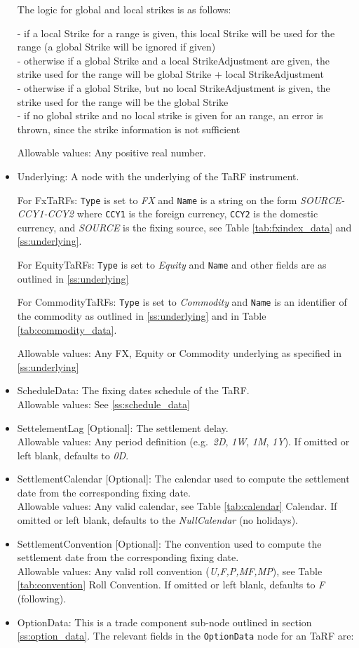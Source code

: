 \begin{itemize}
The logic for global and local strikes is as follows:

- if a local Strike for a range is given, this local Strike will be used for the range (a global Strike will be ignored if given)\\
- otherwise if a global Strike and a local StrikeAdjustment are given, the strike used for the range will be global Strike + local StrikeAdjustment\\
- otherwise if a global Strike, but no local StrikeAdjustment is given, the strike used for the range will be the global Strike\\
- if no global strike and no local strike is given for an range, an error is thrown, since the strike information is not sufficient
    
      Allowable values: Any positive real number. 
    \item Underlying: A node with the underlying of the TaRF instrument.

For FxTaRFs: \lstinline!Type! is set to \emph{FX} and \lstinline!Name! is a string on the form \emph{SOURCE-CCY1-CCY2} where \lstinline!CCY1! is the foreign currency, \lstinline!CCY2! is the domestic currency, and \emph{SOURCE} is the fixing source, see Table \ref{tab:fxindex_data} and  \ref{ss:underlying}.

For EquityTaRFs: \lstinline!Type! is set to \emph{Equity} and \lstinline!Name! and other fields are as outlined in \ref{ss:underlying}

For CommodityTaRFs: \lstinline!Type! is set to \emph{Commodity} and \lstinline!Name! is an identifier of the commodity as outlined in \ref{ss:underlying} and in Table \ref{tab:commodity_data}.

      Allowable values: Any FX, Equity or Commodity underlying as specified in \ref{ss:underlying}
    \item ScheduleData: The fixing dates schedule of the TaRF.\\
      Allowable values: See \ref{ss:schedule_data}
    \item SettelementLag [Optional]: The settlement delay. \\
      Allowable values: Any period definition (e.g.\ \emph{2D}, \emph{1W}, \emph{1M}, \emph{1Y}). If omitted or left blank, defaults to \emph{0D}.
    \item SettlementCalendar [Optional]: The calendar used to compute the settlement date from the corresponding fixing date. \\
      Allowable values: Any valid calendar, see Table \ref{tab:calendar} Calendar. If omitted or left blank, defaults to the \emph{NullCalendar} (no holidays).
    \item SettlementConvention [Optional]: The convention used to compute the settlement date from the corresponding fixing date. \\
      Allowable values: Any valid roll convention (\emph{U,F,P,MF,MP}), see Table \ref{tab:convention} Roll Convention. If omitted or left blank, defaults to \emph{F} (following).
    \item OptionData: This is a trade component sub-node outlined in section \ref{ss:option_data}. 
The relevant fields in the \lstinline!OptionData! node for an TaRF are:


\end{itemize}

